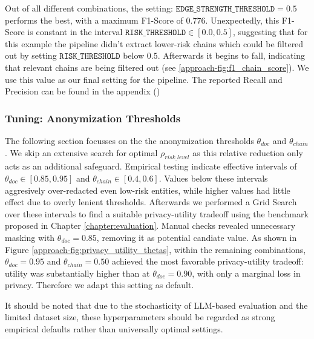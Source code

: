 Out of all different combinations, the setting: $\texttt{EDGE\_STRENGTH\_THRESHOLD} = 0.5$ performs the best, with a maximum F1-Score of 0.776. Unexpectedly, this F1-Score is constant in the interval $\texttt{RISK\_THRESHOLD} \in [0.0,0.5]$, suggesting that for this example the pipeline didn't extract lower-risk chains which could be filtered out by setting $\texttt{RISK\_THRESHOLD}$ below $0.5$. Afterwards it begins to fall, indicating that relevant chains are being filtered out (see \ref{approach-fig:f1_chain_score}). We use this value as our final setting for the pipeline. The reported Recall and Precision can be found in the appendix () %

\subsubsection{Tuning: Anonymization Thresholds}
The following section focusses on the the anonymization thresholds $\theta_{doc}$ and $\theta_{chain}$. We skip an extensive search for optimal $\rho_{risk\_level}$ as this relative reduction only acts as an additional safeguard.
Empirical testing indicate effective intervals of $\theta_{doc}\in[0.85,0.95]$ and $\theta_{chain}\in[0.4,0.6]$. Values below these intervals aggresively over-redacted even low-risk entities, while higher values had little effect due to overly lenient thresholds. Afterwards we performed a Grid Search over these intervals to find a suitable privacy-utility tradeoff using the benchmark proposed in Chapter \ref{chapter:evaluation}. Manual checks revealed unnecessary masking with $\theta_{doc}=0.85$, removing it as potential candiate value. As shown in Figure \ref{approach-fig:privacy_utility_thetas}, within the remaining combinations, $\theta_{doc}=0.95$ and $\theta_{chain}=0.50$ achieved the most favorable privacy-utility tradeoff: utility was substantially higher than at $\theta_{doc}=0.90$, with only a marginal loss in privacy. Therefore we adapt this setting as default.  

It should be noted that due to the stochasticity of LLM-based evaluation and the limited dataset size, these hyperparameters should be regarded as strong empirical defaults rather than universally optimal settings.

